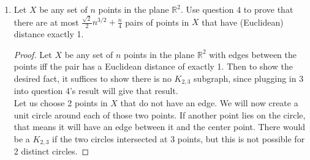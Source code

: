 \documentclass[12pt]{article}
\begin{document}
\begin{enumerate}
\begin{enumerate}
\item Use parts (a) and (b) to conclude that if $e > \frac{1}{2}(m-1)^{1/2} n^{3/2} + \frac{n}{4}$, then $G$ contains $K_{2,m}$. 
\begin{proof}
	Let $G$ be a $n$-vertex graph with $e > \frac{1}{2}(m-1)^{1/2} n^{3/2} + \frac{n}{4}$. Then
	\begin{align*}
		e(\frac{2e}{n}-1) &> \left(\frac{1}{2}(m-1)^{1/2} n^{3/2} + \frac{n}{4}\right)\left(\frac{(m-1)^{1/2} n^{3/2} + \frac{n}{2}}{n}-1\right)\\
		&= \left(\frac{1}{2}(m-1)^{1/2} n^{3/2} + \frac{n}{4}\right)\left((m-1)^{1/2} n^{1/2} -\frac{1}{2}\right)\\
		&= \frac{1}{2}(m-1)n^2-\frac{n}{8}\\
		&= (m-1)(\frac{n^2}{2}-\frac{n}{8(m-1)})\\
		&>(m-1)(\frac{n^2-n}{2})\\
		&= (m-1){n\choose2}
	\end{align*}
	So then using part (b), we get 
	\[\sum_{v \in V(G)} {d(v) \choose 2} \geq e\left(\frac{2e}{n} - 1\right) > (m-1){n\choose2}\]
	So by part (a), we can say $\operatorname{ex}(n, K_{2,m}) \leq \frac{1}{2}(m-1)^{1/2} n^{3/2} + \frac{n}{4}$.
\end{proof}

\end{enumerate}

\medskip 

\item Let $X$ be any set of $n$ points in the plane $\mathbb R^2$. Use question 4 to prove that there are at most $\frac{\sqrt{2}}{2} n^{3/2} + \frac{n}{4}$ pairs of points in $X$ that have (Euclidean) distance exactly 1. 

\begin{proof}
	Let $X$ be any set of $n$ points in the plane $\mathbb R^2$ with edges between the points iff the pair has a Euclidean distance of exactly 1. Then to show the desired fact, it suffices to show there is no $K_{2,3}$ subgraph, since plugging in $3$ into question 4's result will give that result.\\
	Let us choose 2 points in $X$ that do not have an edge. We will now create a unit circle around each of those two points. If another point lies on the circle, that means it will have an edge between it and the center point. There would be a $K_{2,3}$ if the two circles intersected at 3 points, but this is not possible for 2 distinct circles.
\end{proof}

\end{enumerate}
\end{document}
